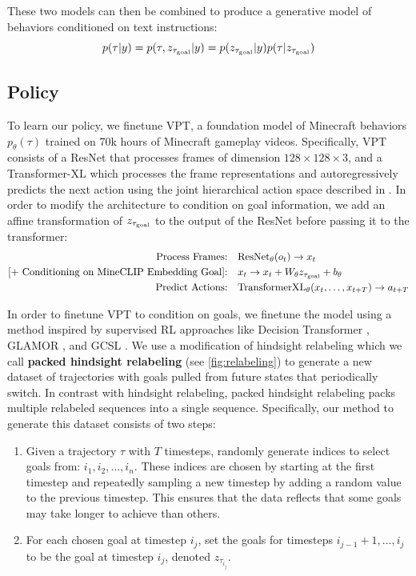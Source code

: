 These two models can then be combined to produce a generative model of behaviors conditioned on text instructions:
\begin{equation}
    p(\tau|y) = p(\tau, z_{\tau_{\text{goal}}}|y) = p(z_{\tau_{\text{goal}}}|y)p(\tau|z_{\tau_{\text{goal}}})
\end{equation}

\subsection{Policy}
To learn our policy, we finetune VPT, a foundation model of Minecraft behaviors $p_\theta(\tau)$ trained on 70k hours of Minecraft gameplay videos. Specifically, VPT consists of a ResNet \citep{resnet} that processes frames of dimension $128 \times 128 \times 3$, and a Transformer-XL \citep{txl} which processes the frame representations and autoregressively predicts the next action using the joint hierarchical action space described in \citet{baker2022vpt}. In order to modify the architecture to condition on goal information, we add an affine transformation of $z_{\tau_{\text{goal}}}$ to the output of the ResNet before passing it to the transformer:
\begin{align*}
    \text{Process Frames:} \quad & \text{ResNet}_{\theta}(o_t) \rightarrow x_t \\
    \text{[+ Conditioning on MineCLIP Embedding Goal]:} \quad & x_t \rightarrow x_t + W_{\theta} z_{\tau_{\text{goal}}} + b_{\theta} \\
    \text{Predict Actions:} \quad & \text{TransformerXL}_{\theta}(x_t, \ldots, x_{t+T}) \rightarrow a_{t+T}
\end{align*}

In order to finetune VPT to condition on goals, we finetune the model using a method inspired by supervised RL approaches like Decision Transformer \citep{chen2021decision}, GLAMOR \citep{paster2020planning}, and GCSL \citep{ghosh2021gcsl}. We use a modification of hindsight relabeling which we call \textbf{packed hindsight relabeling} (see \autoref{fig:relabeling}) to generate a new dataset of trajectories with goals pulled from future states that periodically switch. In contrast with hindsight relabeling, packed hindsight relabeling packs multiple relabeled sequences into a single sequence. Specifically, our method to generate this dataset consists of two steps:
\begin{enumerate}
    \item Given a trajectory $\tau$ with $T$ timesteps, randomly generate indices to select goals from: $i_1, i_2, \ldots, i_n$. These indices are chosen by starting at the first timestep and repeatedly sampling a new timestep by adding a random value to the previous timestep. This ensures that the data reflects that some goals may take longer to achieve than others.
    \item For each chosen goal at timestep $i_j$, set the goals for timesteps $i_{j-1} + 1, \ldots, i_j$ to be the goal at timestep $i_j$, denoted $z_{\tau_{i_j}}$.
\end{enumerate}

